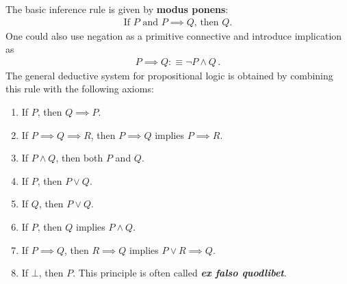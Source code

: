 
    The basic inference rule is given by \textbf{modus ponens}:
    \begin{gather}
        \text{If } P \text{ and } P\implies Q \text{, then } Q.
    \end{gather}
    One could also use negation as a primitive connective and introduce implication as
    \begin{gather}
        P\implies Q :\equiv \lnot P\land Q\,.
    \end{gather}
    The general deductive system for propositional logic is obtained by combining this rule with the following axioms:
    \begin{enumerate}
        \item If $P$, then $Q\implies P$.
        \item If $P\implies Q \implies R$, then $P\implies Q$ implies $P\implies R$.
        \item If $P\land Q$, then both $P$ and $Q$.
        \item If $P$, then $P\lor Q$.
        \item If $Q$, then $P\lor Q$.
        \item If $P$, then $Q$ implies $P\land Q$.
        \item If $P\implies Q$, then $R\implies Q$ implies $P\lor R\implies Q$.
        \item If $\bot$, then $P$. This principle is often called \textit{\textbf{ex falso quodlibet}}.
    \end{enumerate}

